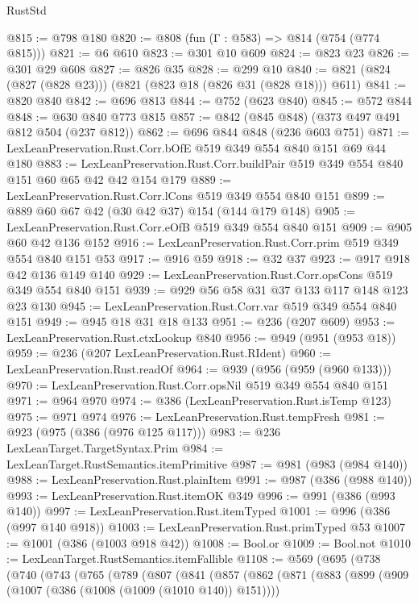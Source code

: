 \begin{lexlean}{RustStd}
\begin{coremodule}
@815 := @798 @180
@820 := @808 (fun (Γ : @583) => @814 (@754 (@774 @815)))
@821 := @6 @610
@823 := @301 @10 @609
@824 := @823 @23
@826 := @301 @29 @608
@827 := @826 @35
@828 := @299 @10
@840 := @821 (@824 (@827 (@828 @23))) (@821 (@823 @18 (@826 @31 (@828 @18))) @611)
@841 := @820 @840
@842 := @696 @813
@844 := @752 (@623 @840)
@845 := @572 @844
@848 := @630 @840 @773 @815
@857 := @842 (@845 @848) (@373 @497 @491 @812 @504 (@237 @812))
@862 := @696 @844 @848 (@236 @603 @751)
@871 := LexLeanPreservation.Rust.Corr.bOfE @519 @349 @554 @840 @151 @69 @44 @180
@883 := LexLeanPreservation.Rust.Corr.buildPair @519 @349 @554 @840 @151 @60 @65 @42 @42 @154 @179
@889 := LexLeanPreservation.Rust.Corr.lCons @519 @349 @554 @840 @151
@899 := @889 @60 @67 @42 (@30 @42 @37) @154 (@144 @179 @148)
@905 := LexLeanPreservation.Rust.Corr.eOfB @519 @349 @554 @840 @151
@909 := @905 @60 @42 @136 @152
@916 := LexLeanPreservation.Rust.Corr.prim @519 @349 @554 @840 @151 @53
@917 := @916 @59
@918 := @32 @37
@923 := @917 @918 @42 @136 @149 @140
@929 := LexLeanPreservation.Rust.Corr.opsCons @519 @349 @554 @840 @151
@939 := @929 @56 @58 @31 @37 @133 @117 @148 @123 @23 @130
@945 := LexLeanPreservation.Rust.Corr.var @519 @349 @554 @840 @151
@949 := @945 @18 @31 @18 @133
@951 := @236 (@207 @609)
@953 := LexLeanPreservation.Rust.ctxLookup @840
@956 := @949 (@951 (@953 @18))
@959 := @236 (@207 LexLeanPreservation.Rust.RIdent)
@960 := LexLeanPreservation.Rust.readOf
@964 := @939 (@956 (@959 (@960 @133)))
@970 := LexLeanPreservation.Rust.Corr.opsNil @519 @349 @554 @840 @151
@971 := @964 @970
@974 := @386 (LexLeanPreservation.Rust.isTemp @123)
@975 := @971 @974
@976 := LexLeanPreservation.Rust.tempFresh
@981 := @923 (@975 (@386 (@976 @125 @117)))
@983 := @236 LexLeanTarget.TargetSyntax.Prim
@984 := LexLeanTarget.RustSemantics.itemPrimitive
@987 := @981 (@983 (@984 @140))
@988 := LexLeanPreservation.Rust.plainItem
@991 := @987 (@386 (@988 @140))
@993 := LexLeanPreservation.Rust.itemOK @349
@996 := @991 (@386 (@993 @140))
@997 := LexLeanPreservation.Rust.itemTyped
@1001 := @996 (@386 (@997 @140 @918))
@1003 := LexLeanPreservation.Rust.primTyped @53
@1007 := @1001 (@386 (@1003 @918 @42))
@1008 := Bool.or
@1009 := Bool.not
@1010 := LexLeanTarget.RustSemantics.itemFallible
@1108 := @569
    (@695
      (@738
        (@740
          (@743
            (@765
              (@789
                (@807
                  (@841
                    (@857
                      (@862
                        (@871
                          (@883
                            (@899
                              (@909 (@1007 (@386 (@1008 (@1009 (@1010 @140)) @151))))

\end{coremodule}
\end{lexlean}
